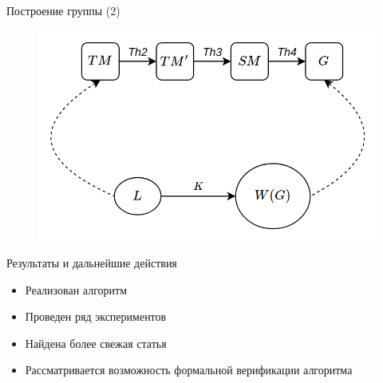 \documentclass[xcolor=table]{beamer}
\begin{document}
\begin{frame}[fragile]{Построение группы (2)}
\begin{figure}[H]
  \centering
  \includegraphics[width=120mm]{pictures/2.png}
 \end{figure}
\end{frame}

\begin{frame}[fragile]{Результаты и дальнейшие действия}
    \begin{itemize}
        \item Реализован алгоритм
        \item Проведен ряд экспериментов
        \item Найдена более свежая статья
        \item Рассматривается возможность формальной верификации алгоритма
    \end{itemize}
\end{frame}
\end{document}
